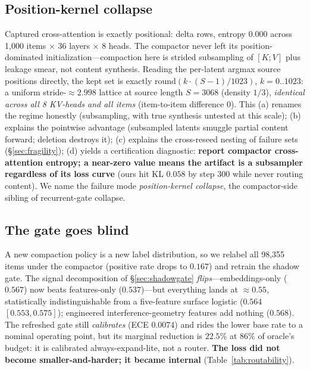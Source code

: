 \documentclass[11pt]{article}
\begin{document}
\subsection{Position-kernel collapse}
\label{sec:collapse}
Captured cross-attention is exactly positional: delta rows, entropy $0.000$
across 1{,}000 items $\times$ 36 layers $\times$ 8 heads. The compactor never
left its position-dominated initialization---compaction here is strided
subsampling of $[K;V]$ plus leakage smear, not content synthesis. Reading
the per-latent argmax source positions directly, the kept set is exactly
$\mathrm{round}(k\cdot(S{-}1)/1023)$, $k{=}0..1023$: a uniform stride-${\approx}2.998$
lattice at source length $S{=}3068$ (density $1/3$), \emph{identical across
all 8 KV-heads and all items} (item-to-item difference $0$). This (a) renames
the regime honestly (subsampling, with true synthesis untested at this
scale); (b) explains the pointwise advantage (subsampled latents smuggle
partial content forward; deletion destroys it); (c) explains the cross-reseed
nesting of failure sets (\S\ref{sec:fragility}); (d) yields a certification
diagnostic: \textbf{report compactor cross-attention entropy; a near-zero
value means the artifact is a subsampler regardless of its loss curve} (ours
hit KL $0.058$ by step 300 while never routing content). We name the failure
mode \emph{position-kernel collapse}, the compactor-side sibling of
recurrent-gate collapse.

\subsection{The gate goes blind}
\label{sec:blind}
A new compaction policy is a new label distribution, so we relabel all
98{,}355 items under the compactor (positive rate drops to $0.167$) and
retrain the shadow gate. The signal decomposition of \S\ref{sec:shadowgate}
\emph{flips}---embeddings-only ($0.567$) now beats features-only
($0.537$)---but everything lands at ${\approx}0.55$, statistically
indistinguishable from a five-feature surface logistic ($0.564$ $[0.553,
0.575]$); engineered interference-geometry features add nothing ($0.568$).
The refreshed gate still \emph{calibrates} (ECE $0.0074$) and rides the lower
base rate to a nominal operating point, but its marginal reduction is
$22.5\%$ at $86\%$ of oracle's budget: it is calibrated always-expand-lite,
not a router. \textbf{The loss did not become smaller-and-harder; it became
internal} (Table~\ref{tab:routability}).
\end{document}
